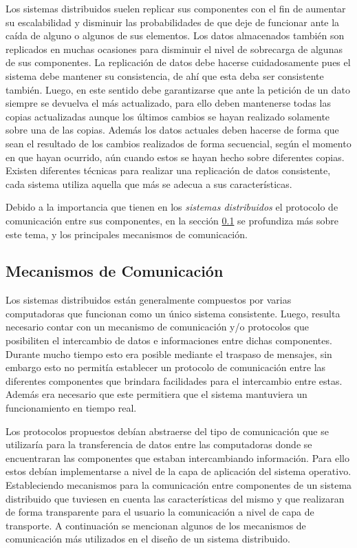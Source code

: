 Los sistemas distribuidos suelen replicar sus componentes con el fin de aumentar
su escalabilidad y disminuir las probabilidades de que deje de
funcionar ante la caída de alguno o algunos de sus elementos. Los datos
almacenados también son replicados en muchas ocasiones para disminuir el nivel
de sobrecarga de algunas de sus componentes. La replicación de datos
debe hacerse cuidadosamente pues el sistema debe mantener su consistencia, de
ahí que esta deba ser consistente también. Luego, en este
sentido debe garantizarse que ante la petición de un dato siempre se devuelva
el más actualizado, para ello deben mantenerse todas las copias
actualizadas aunque los últimos cambios se hayan realizado solamente sobre una
de las copias. Además los datos actuales deben hacerse de forma que sean el 
resultado de los cambios realizados de forma secuencial, según
el momento en que hayan ocurrido, aún cuando estos se hayan hecho
sobre diferentes copias. Existen diferentes técnicas para realizar una
replicación de datos consistente, cada sistema utiliza aquella que más se adecua
a sus características\cite{Tanenbaum2007}. %

Debido a la importancia que tienen en los \emph{sistemas distribuidos} el
protocolo de comunicación entre sus componentes, en la sección
\ref{communication} se profundiza más sobre este tema, y los principales
mecanismos de comunicación.

\subsection{Mecanismos de Comunicación}
\label{communication}

Los sistemas distribuidos están generalmente compuestos por varias computadoras
que funcionan como un único sistema consistente. Luego, resulta necesario contar 
con un mecanismo de comunicación y/o protocolos que posibiliten el intercambio 
de datos e informaciones entre dichas componentes. Durante mucho tiempo
esto era posible mediante el traspaso de mensajes, sin embargo esto no permitía
establecer un protocolo de comunicación entre las diferentes componentes que
brindara facilidades para el intercambio entre estas. Además era necesario que
este permitiera que el sistema mantuviera un funcionamiento en tiempo real. 

Los protocolos propuestos debían abstraerse del tipo de comunicación que se
utilizaría para la transferencia de datos entre las computadoras donde se
encuentraran las componentes que estaban intercambiando información. Para ello
estos debían implementarse a nivel de la capa de aplicación del sistema
operativo. Estableciendo mecanismos para la comunicación entre componentes de un
sistema distribuido que tuviesen en cuenta las características del mismo y que
realizaran de forma transparente para el usuario la comunicación a nivel de capa
de transporte. A continuación se mencionan algunos de los mecanismos de
comunicación más utilizados en el diseño de un sistema
distribuido\cite{Tanenbaum2007}.

